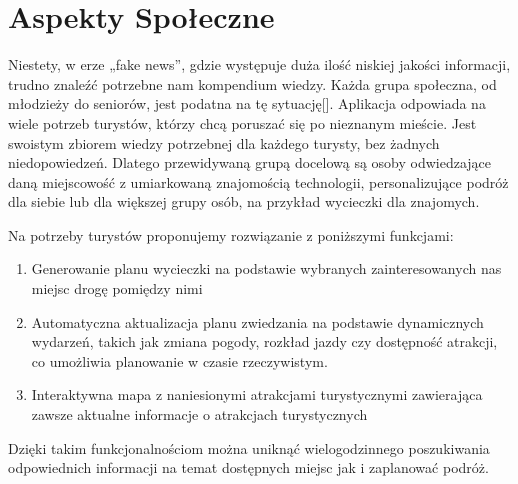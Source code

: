 

\section{Aspekty Społeczne}
\label{subsec:aspekty-spoleczne}



\par Niestety, w erze „fake news”, gdzie występuje duża ilość niskiej jakości informacji, trudno znaleźć potrzebne nam kompendium wiedzy. Każda grupa społeczna, od młodzieży do seniorów, jest podatna na tę sytuację[].
Aplikacja odpowiada na wiele potrzeb turystów, którzy chcą poruszać się po nieznanym mieście. Jest swoistym zbiorem wiedzy potrzebnej dla każdego turysty, bez żadnych niedopowiedzeń. Dlatego przewidywaną grupą docelową są osoby odwiedzające daną miejscowość z umiarkowaną znajomością technologii, personalizujące podróż dla siebie lub dla większej grupy osób, na przykład wycieczki dla znajomych.




\newline\indent Na potrzeby turystów proponujemy rozwiązanie z poniższymi funkcjami:
\begin{enumerate}
   \item 	Generowanie planu wycieczki na podstawie wybranych zainteresowanych nas miejsc drogę pomiędzy nimi
   \item 	Automatyczna aktualizacja planu zwiedzania na podstawie dynamicznych wydarzeń, takich jak zmiana pogody, rozkład jazdy czy dostępność atrakcji, co umożliwia planowanie w czasie rzeczywistym.
   \item	Interaktywna mapa z naniesionymi atrakcjami turystycznymi zawierająca zawsze aktualne informacje o atrakcjach turystycznych
\end{enumerate}
\newline \indent Dzięki takim funkcjonalnościom można uniknąć wielogodzinnego poszukiwania odpowiednich informacji na temat dostępnych miejsc jak i zaplanować podróż.
